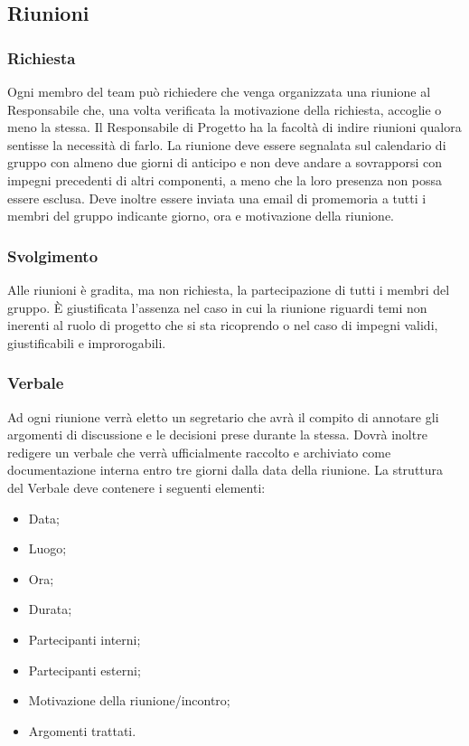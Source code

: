 \subsection{Riunioni}


\subsubsection{Richiesta}

Ogni membro del team può richiedere che venga organizzata una riunione al Responsabile che, una volta verificata la motivazione della richiesta, accoglie o meno la stessa.
Il Responsabile di Progetto ha la facoltà di indire riunioni qualora sentisse la necessità di farlo.
La riunione deve essere segnalata sul calendario di gruppo con almeno due giorni di anticipo e non deve andare a sovrapporsi con impegni precedenti di altri componenti, a meno che la loro presenza non possa essere esclusa. Deve inoltre essere inviata una email di promemoria a tutti i membri del gruppo indicante giorno, ora e motivazione della riunione.

\subsubsection{Svolgimento}

Alle riunioni è gradita, ma non richiesta, la partecipazione di tutti i membri del gruppo. È giustificata l'assenza nel caso in cui la riunione riguardi temi non inerenti al ruolo di progetto che si sta ricoprendo o nel caso di impegni validi, giustificabili e improrogabili.

\subsubsection{Verbale}

Ad ogni riunione verrà eletto un segretario che avrà il compito di annotare gli argomenti di discussione e le decisioni prese durante la stessa.
Dovrà inoltre redigere un verbale che verrà ufficialmente raccolto e archiviato come documentazione interna entro tre giorni dalla data della riunione.
La struttura del Verbale deve contenere i seguenti elementi:
\begin{itemize}
\item Data;
\item Luogo;
\item Ora;
\item Durata;
\item Partecipanti interni;
\item Partecipanti esterni;
\item Motivazione della riunione/incontro;
\item Argomenti trattati.
\end{itemize}


